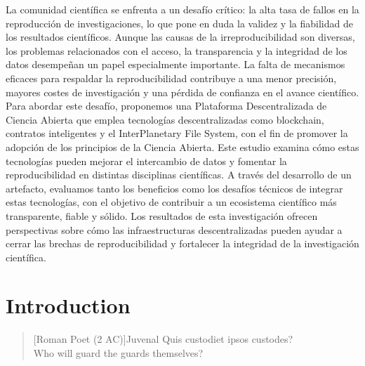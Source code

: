 \documentclass[final]{rc-book-2.14}
\begin{document}
\drop La comunidad científica se enfrenta a un desafío crítico: la alta tasa de fallos en la reproducción de investigaciones, lo que pone en duda la validez y la fiabilidad de los resultados científicos. Aunque las causas de la irreproducibilidad son diversas, los problemas relacionados con el acceso, la transparencia y la integridad de los datos desempeñan un papel especialmente importante. La falta de mecanismos eficaces para respaldar la reproducibilidad contribuye a una menor precisión, mayores costes de investigación y una pérdida de confianza en el avance científico. Para abordar este desafío, proponemos una Plataforma Descentralizada de Ciencia Abierta que emplea tecnologías descentralizadas como blockchain, contratos inteligentes y el InterPlanetary File System, con el fin de promover la adopción de los principios de la Ciencia Abierta. Este estudio examina cómo estas tecnologías pueden mejorar el intercambio de datos y fomentar la reproducibilidad en distintas disciplinas científicas. A través del desarrollo de un artefacto, evaluamos tanto los beneficios como los desafíos técnicos de integrar estas tecnologías, con el objetivo de contribuir a un ecosistema científico más transparente, fiable y sólido. Los resultados de esta investigación ofrecen perspectivas sobre cómo las infraestructuras descentralizadas pueden ayudar a cerrar las brechas de reproducibilidad y fortalecer la integridad de la investigación científica.


\mainmatter


\chapter{Introduction}
\label{chp:introduction}

\begin{quotation}[Roman Poet (2 AC)]{Juvenal}
    Quis custodiet ipsos custodes? \\ Who will guard the guards themselves?
\end{quotation}
\end{document}
